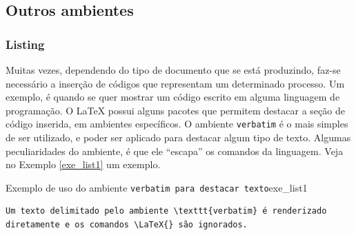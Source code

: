 %
%
%
%

\subsection{Outros ambientes}
\label{sec:out_ambs}

\subsubsection*{Listing}
\label{sec:listing}


Muitas vezes, dependendo do tipo de documento que se está produzindo, faz-se necessário a inserção de códigos que representam um determinado processo. Um exemplo, é quando se quer mostrar um código escrito em alguma linguagem de programação. O \LaTeX{} possui alguns pacotes que permitem destacar a seção de código inserida, em ambientes específicos. O ambiente {\tt verbatim} é o mais simples de ser utilizado, e poder ser aplicado para destacar algum tipo de texto. Algumas peculiaridades do ambiente, é que ele ``escapa'' os comandos da linguagem. Veja no Exemplo \ref{exe_list1} um exemplo.

\begin{texexptitled}[breakable,center lower,enhanced,middle=2mm]{Exemplo de uso do ambiente {\tt verbatim para destacar texto}}{exe_list1}
\begin{verbatim}
Um texto delimitado pelo ambiente \texttt{verbatim} é renderizado 
diretamente e os comandos \LaTeX{} são ignorados.
\end{verbatim}
\end{texexptitled}

